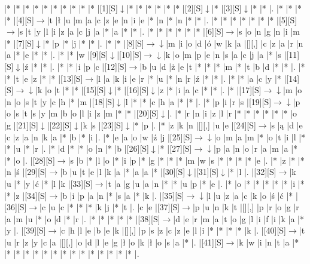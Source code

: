 \documentclass[11pt]{article}
\newcommand\drarr{$\rightarrow \!\!\!\!\! \downarrow$}
\newcommand\rarr{$\rightarrow$}
\newcommand\darr{$\downarrow$}
\begin{document}
\noindent\begin{Puzzle}{21}{24}|*	|*	|*	|*	|*	|*	|*	|*	|*	|*	|[1][S]\darr	|*	|*	|*	|*	|*	|*	|[2][S]\darr	|*	|[3][S]\darr	|*	|*	|.
|*	|*	|*	|*	|[4][S]\rarr	|t	|ł	|u	|m	|a	|c	|z	|e	|n	|i	|e	|*	|n	|*	|n	|*	|*	|.
|*	|*	|*	|*	|*	|*	|*	|[5][S]\rarr	|s	|t	|y	|l	|i	|z	|a	|c	|j	|a	|*	|a	|*	|*	|.
|*	|*	|*	|*	|*	|*	|[6][S]\rarr	|s	|o	|n	|g	|n	|i	|m	|*	|[7][S]\darr	|*	|p	|*	|j	|*	|*	|.
|*	|*	|[8][S]\drarr	|m	|i	|o	|d	|ó	|w	|k	|a	|[][,]{ }	|c	|z	|a	|r	|n	|a	|*	|e	|*	|*	|.
|*	|*	|w	|[9][S]\darr	|[10][S]\drarr	|k	|o	|m	|p	|e	|n	|s	|a	|c	|j	|a	|*	|s	|[11][S]\darr	|ź	|*	|*	|.
|*	|*	|i	|p	|c	|[12][S]\rarr	|b	|u	|d	|ż	|e	|t	|*	|*	|*	|m	|*	|t	|b	|d	|*	|*	|.
|*	|*	|t	|e	|z	|*	|*	|[13][S]\rarr	|l	|a	|k	|i	|e	|r	|*	|u	|*	|n	|r	|ź	|*	|*	|.
|*	|*	|a	|c	|y	|*	|[14][S]\drarr	|k	|o	|t	|*	|*	|[15][S]\darr	|*	|[16][S]\darr	|z	|*	|i	|a	|c	|*	|*	|.
|*	|[17][S]\drarr	|m	|o	|n	|o	|s	|t	|y	|c	|h	|*	|m	|[18][S]\darr	|l	|*	|*	|c	|h	|a	|*	|*	|.
|*	|p	|i	|r	|s	|[19][S]\drarr	|p	|o	|s	|t	|s	|y	|m	|b	|o	|l	|i	|z	|m	|*	|*	|[20][S]\darr	|.
|*	|r	|n	|i	|z	|l	|r	|*	|*	|*	|*	|*	|*	|o	|g	|[21][S]\darr	|[22][S]\darr	|k	|s	|[23][S]\darr	|*	|p	|.
|*	|z	|k	|n	|[][,]{ }	|u	|e	|[24][S]\rarr	|s	|ą	|d	|e	|c	|z	|a	|n	|k	|a	|*	|b	|*	|i	|.
|*	|e	|a	|o	|w	|ź	|j	|[25][S]\drarr	|o	|m	|a	|m	|*	|o	|t	|i	|l	|*	|*	|u	|*	|r	|.
|*	|d	|*	|*	|o	|n	|*	|b	|[26][S]\darr	|*	|[27][S]\drarr	|p	|a	|n	|o	|r	|a	|m	|a	|*	|*	|o	|.
|[28][S]\rarr	|s	|b	|*	|l	|o	|*	|i	|p	|*	|g	|*	|*	|*	|m	|w	|s	|*	|*	|*	|*	|e	|.
|*	|z	|*	|*	|n	|ś	|[29][S]\rarr	|b	|u	|t	|e	|l	|k	|a	|*	|a	|a	|*	|[30][S]\darr	|[31][S]\darr	|*	|l	|.
|[32][S]\rarr	|k	|u	|*	|y	|ć	|*	|l	|k	|[33][S]\rarr	|t	|a	|g	|u	|a	|n	|*	|*	|u	|p	|*	|e	|.
|*	|o	|*	|*	|*	|*	|*	|i	|*	|*	|z	|[34][S]\rarr	|b	|i	|p	|a	|n	|*	|s	|a	|*	|k	|.
|[35][S]\drarr	|l	|u	|z	|a	|c	|k	|o	|ś	|ć	|*	|[36][S]\rarr	|c	|u	|c	|*	|*	|*	|k	|j	|*	|t	|.
|c	|e	|[37][S]\rarr	|p	|u	|n	|k	|t	|[][,]{ }	|p	|r	|o	|g	|r	|a	|m	|u	|*	|o	|d	|*	|r	|.
|*	|*	|*	|*	|*	|[38][S]\rarr	|d	|e	|r	|m	|a	|t	|o	|g	|l	|i	|f	|i	|k	|a	|*	|y	|.
|[39][S]\rarr	|c	|h	|l	|e	|b	|e	|k	|[][,]{ }	|p	|s	|z	|c	|z	|e	|l	|i	|*	|*	|*	|*	|k	|.
|[40][S]\rarr	|t	|u	|r	|z	|y	|c	|a	|[][,]{ }	|o	|d	|l	|e	|g	|ł	|o	|k	|ł	|o	|s	|a	|*	|.
|[41][S]\rarr	|k	|w	|i	|n	|t	|a	|*	|*	|*	|*	|*	|*	|*	|*	|*	|*	|*	|*	|*	|*	|*	|.\end{Puzzle}

\newpage
\end{document}
